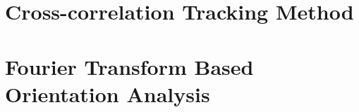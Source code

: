 
\section{Cross-correlation Tracking Method}
\label{cross-correlation-tracking-method}

\section{Fourier Transform Based Orientation Analysis}
\label{fourier-transform-based-orientation-analysis}
